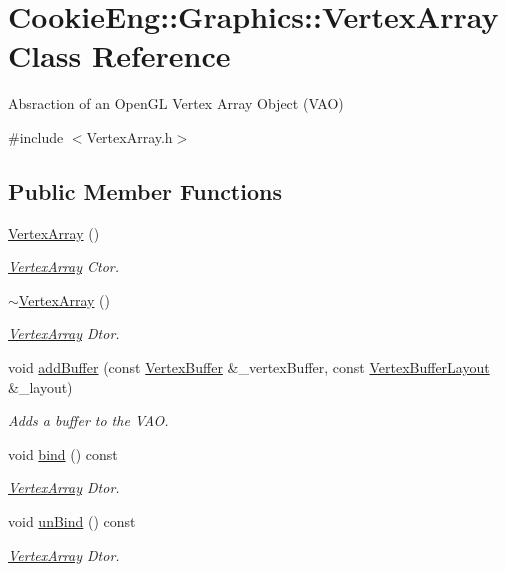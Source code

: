 \hypertarget{class_cookie_eng_1_1_graphics_1_1_vertex_array}{}\section{Cookie\+Eng\+:\+:Graphics\+:\+:Vertex\+Array Class Reference}
\label{class_cookie_eng_1_1_graphics_1_1_vertex_array}


Absraction of an Open\+GL Vertex Array Object (V\+AO)  




{\ttfamily \#include $<$Vertex\+Array.\+h$>$}

\subsection*{Public Member Functions}
\begin{DoxyCompactItemize}
\item 
\hyperlink{class_cookie_eng_1_1_graphics_1_1_vertex_array_a9ca1229bf83878acd80e947487b2a9ac}{Vertex\+Array} ()
\begin{DoxyCompactList}\small\item\em \hyperlink{class_cookie_eng_1_1_graphics_1_1_vertex_array}{Vertex\+Array} Ctor. \end{DoxyCompactList}\item 
\hyperlink{class_cookie_eng_1_1_graphics_1_1_vertex_array_a114da6690772eaa07108e2dccaa8e93d}{$\sim$\+Vertex\+Array} ()
\begin{DoxyCompactList}\small\item\em \hyperlink{class_cookie_eng_1_1_graphics_1_1_vertex_array}{Vertex\+Array} Dtor. \end{DoxyCompactList}\item 
void \hyperlink{class_cookie_eng_1_1_graphics_1_1_vertex_array_aacb98fcc69be4c0ca1a4d8deb38b053e}{add\+Buffer} (const \hyperlink{class_cookie_eng_1_1_graphics_1_1_vertex_buffer}{Vertex\+Buffer} \&\+\_\+vertex\+Buffer, const \hyperlink{class_cookie_eng_1_1_graphics_1_1_vertex_buffer_layout}{Vertex\+Buffer\+Layout} \&\+\_\+layout)
\begin{DoxyCompactList}\small\item\em Adds a buffer to the V\+AO. \end{DoxyCompactList}\item 
void \hyperlink{class_cookie_eng_1_1_graphics_1_1_vertex_array_afaa952a05a501cb487831cb6e9e052bf}{bind} () const
\begin{DoxyCompactList}\small\item\em \hyperlink{class_cookie_eng_1_1_graphics_1_1_vertex_array}{Vertex\+Array} Dtor. \end{DoxyCompactList}\item 
void \hyperlink{class_cookie_eng_1_1_graphics_1_1_vertex_array_acd3511d77ec22d63984e365e05ef9bcb}{un\+Bind} () const
\begin{DoxyCompactList}\small\item\em \hyperlink{class_cookie_eng_1_1_graphics_1_1_vertex_array}{Vertex\+Array} Dtor. \end{DoxyCompactList}\end{DoxyCompactItemize}
